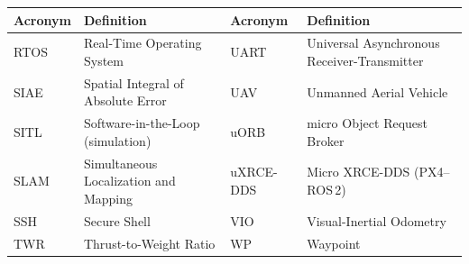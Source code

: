 \begin{tabular}{p{}p{}p{}p{}}
\toprule
\textbf{Acronym} & \textbf{Definition} &
\textbf{Acronym} & \textbf{Definition} \\
\midrule
RTOS & Real-Time Operating System &
UART & Universal Asynchronous Receiver-Transmitter \\
SIAE & Spatial Integral of Absolute Error &
UAV & Unmanned Aerial Vehicle \\
SITL & Software-in-the-Loop (simulation) &
uORB & micro Object Request Broker \\
SLAM & Simultaneous Localization and Mapping &
uXRCE-DDS & Micro XRCE-DDS (PX4--ROS\,2) \\
SSH & Secure Shell &
VIO & Visual-Inertial Odometry \\
TWR & Thrust-to-Weight Ratio &
WP & Waypoint \\
\bottomrule
\end{tabular}
\normalsize